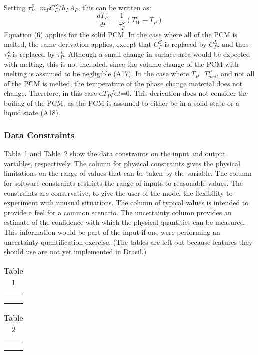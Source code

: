 \documentclass[12pt]{article}
\begin{document}
Setting $\tau{}_{P}^{S}$=$m_{P}$$C_{P}^{S}$/$h_{P}$$A_{P}$, this can be written as:
\begin{equation}
\frac{dT_{P}}{dt}=\frac{1}{\tau{}_{P}^{S}}(T_{W}-T_{P})
\end{equation}
Equation (6) applies for the solid PCM. In the case where all of the PCM is melted, the same derivation applies, except that $C_{P}^{S}$ is replaced by $C_{P}^{L}$, and thus $\tau{}_{P}^{S}$ is replaced by $\tau{}_{P}^{L}$. Although a small change in surface area would be expected with melting, this is not included, since the volume change of the PCM with melting is assumed to be negligible (A17).
In the case where $T_{P}$=$T_{melt}^{P}$ and not all of the PCM is melted, the temperature of the phase change material does not change. Therefore, in this case d$T_{P}$/d$t$=0.
This derivation does not consider the boiling of the PCM, as the PCM is assumed to either be in a solid state or a liquid state (A18).
\subsubsection{Data Constraints}
\label{Sec:DataCons}
Table~\ref{Table:Tabl1} and Table~\ref{Table:Tabl2} show the data constraints on the input and output variables, respectively. The column for physical constraints gives the physical limitations on the range of values that can be taken by the variable. The column for software constraints restricts the range of inputs to reasonable values. The constraints are conservative, to give the user of the model the flexibility to experiment with unusual situations. The column of typical values is intended to provide a feel for a common scenario. The uncertainty column provides an estimate of the confidence with which the physical quantities can be measured. This information would be part of the input if one were performing an uncertainty quantification exercise. (The tables are left out because features they should use are not yet implemented in Drasil.)
\begin{longtable}{l l}
\toprule
 & 
\\
\midrule
 & 
\\
 & 
\\
\bottomrule
\caption{Table 1}
\label{Table:Tabl1}
\end{longtable}
\begin{longtable}{l l}
\toprule
 & 
\\
\midrule
 & 
\\
 & 
\\
\bottomrule
\caption{Table 2}
\label{Table:Tabl2}
\end{longtable}
\end{document}

